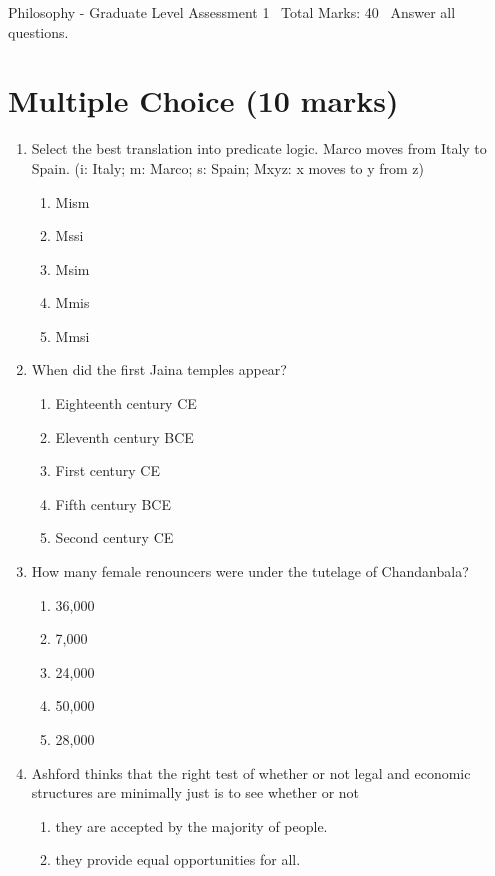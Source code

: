 \documentclass[12pt]{article}
\begin{document}
\begin{center}
Philosophy - Graduate Level Assessment 1 \
Total Marks: 40 \
Answer all questions.
\end{center}

\section*{Multiple Choice (10 marks)}
\begin{enumerate}[label=\arabic*.]
\item Select the best translation into predicate logic. Marco moves from Italy to Spain. (i: Italy; m: Marco; s: Spain; Mxyz: x moves to y from z)
\begin{enumerate}[label=(\alph*)]
    \item Mism
    \item Mssi
    \item Msim
    \item Mmis
    \item Mmsi
\end{enumerate}
\item When did the first Jaina temples appear?
\begin{enumerate}[label=(\alph*)]
    \item Eighteenth century CE
    \item Eleventh century BCE
    \item First century CE
    \item Fifth century BCE
    \item Second century CE
\end{enumerate}
\item How many female renouncers were under the tutelage of Chandanbala?
\begin{enumerate}[label=(\alph*)]
    \item 36,000
    \item 7,000
    \item 24,000
    \item 50,000
    \item 28,000
\end{enumerate}
\item Ashford thinks that the right test of whether or not legal and economic structures are minimally just is to see whether or not
\begin{enumerate}[label=(\alph*)]
    \item they are accepted by the majority of people.
    \item they provide equal opportunities for all.

\end{enumerate}
\end{enumerate}
\end{document}
